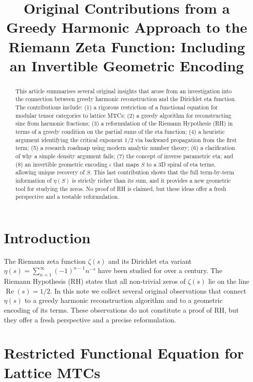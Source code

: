 \documentclass[12pt,a4paper]{article}
\title{Original Contributions from a Greedy Harmonic Approach to the Riemann Zeta Function: Including an Invertible Geometric Encoding}
\author{}
\date{}
\begin{document}
\maketitle

\begin{abstract}
This article summarises several original insights that arose from an investigation into the connection between greedy harmonic reconstruction and the Dirichlet eta function. The contributions include: (1) a rigorous restriction of a functional equation for modular tensor categories to lattice MTCs; (2) a greedy algorithm for reconstructing sine from harmonic fractions; (3) a reformulation of the Riemann Hypothesis (RH) in terms of a greedy condition on the partial sums of the eta function; (4) a heuristic argument identifying the critical exponent $1/2$ via backward propagation from the first term; (5) a research roadmap using modern analytic number theory; (6) a clarification of why a simple density argument fails; (7) the concept of inverse parametric eta; and (8) an invertible geometric encoding $\iota$ that maps $S$ to a 3D spiral of eta terms, allowing unique recovery of $S$. This last contribution shows that the full term‑by‑term information of $\eta(S)$ is strictly richer than its sum, and it provides a new geometric tool for studying the zeros. No proof of RH is claimed, but these ideas offer a fresh perspective and a testable reformulation.
\end{abstract}

\section{Introduction}

The Riemann zeta function $\zeta(s)$ and its Dirichlet eta variant $\eta(s)=\sum_{n=1}^\infty (-1)^{n-1}n^{-s}$ have been studied for over a century. The Riemann Hypothesis (RH) states that all non‑trivial zeros of $\zeta(s)$ lie on the line $\operatorname{Re}(s)=1/2$. In this note we collect several original observations that connect $\eta(s)$ to a greedy harmonic reconstruction algorithm and to a geometric encoding of its terms. These observations do not constitute a proof of RH, but they offer a fresh perspective and a precise reformulation.

\section{Restricted Functional Equation for Lattice MTCs}
\end{document}
